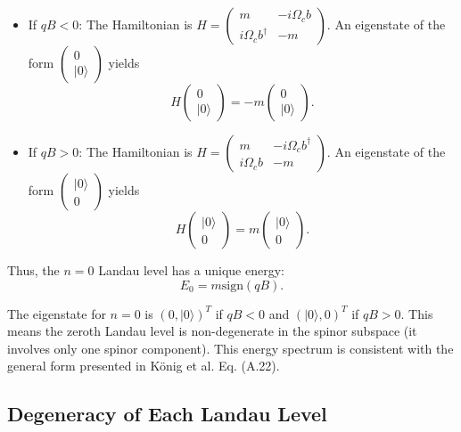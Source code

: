 \documentclass[11pt]{article}
\newcommand{\sgn}{\mathrm{sign}}
\begin{document}
\begin{itemize}
    \item If $qB < 0$: The Hamiltonian is $H = \begin{pmatrix} m & -i \Omega_c b \\ i \Omega_c b^\dagger & -m \end{pmatrix}$. An eigenstate of the form $\begin{pmatrix} 0 \\ |0\rangle \end{pmatrix}$ yields 
    $$H \begin{pmatrix} 0 \\ |0\rangle \end{pmatrix} = -m \begin{pmatrix} 0 \\ |0\rangle \end{pmatrix}.$$

    \item If $qB > 0$: The Hamiltonian is $H = \begin{pmatrix} m & -i \Omega_c b^\dagger \\ i \Omega_c b & -m \end{pmatrix}$. An eigenstate of the form $\begin{pmatrix} |0\rangle \\ 0 \end{pmatrix}$ yields 
    $$H \begin{pmatrix} |0\rangle \\ 0 \end{pmatrix} = m \begin{pmatrix} |0\rangle \\ 0 \end{pmatrix}.$$
\end{itemize}

Thus, the $n=0$ Landau level has a unique energy:
\begin{equation}
  \boxed{E_0 = m \sgn(qB).}
\end{equation}

The eigenstate for $n=0$ is $(0, |0\rangle)^T$ if $qB<0$ and $(|0\rangle, 0)^T$ if $qB>0$. This means the zeroth Landau level is non-degenerate in the spinor subspace (it involves only one spinor component). This energy spectrum is consistent with the general form presented in König et al. \cite{PhysRevB.88.035106} Eq. (A.22).

\subsection{Degeneracy of Each Landau Level}
\end{document}
